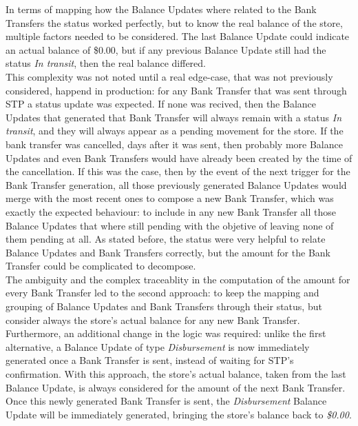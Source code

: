 In terms of mapping how the Balance Updates where related to the Bank Transfers the status worked perfectly, but to know the real balance of the store, multiple factors needed to be considered. The last Balance Update could indicate an actual balance of \$0.00, but if any previous Balance Update still had the status \textit{In transit}, then the real balance differed.\\ 

This complexity was not noted until a real edge-case, that was not previously considered, happend in production: for any Bank Transfer that was sent through STP a status update was expected. If none was recived, then the Balance Updates that generated that Bank Transfer will always remain with a status \textit{In transit}, and they will always appear as a pending movement for the store. If the bank transfer was cancelled, days after it was sent, then probably more Balance Updates and even Bank Transfers would have already been created by the time of the cancellation. If this was the case, then by the event of the next trigger for the Bank Transfer generation, all those previously generated Balance Updates would merge with the most recent ones to compose a new Bank Transfer, which was exactly the expected behaviour: to include in any new Bank Transfer all those Balance Updates that where still pending with the objetive of leaving none of them pending at all. As stated before, the status were very helpful to relate Balance Updates and Bank Transfers correctly, but the amount for the Bank Transfer could be complicated to decompose.\\

The ambiguity and the complex traceablity in the computation of the amount for every Bank Transfer led to the second approach: to keep the mapping and grouping of Balance Updates and Bank Transfers through their status, but consider always the store's actual balance for any new Bank Transfer. Furthermore, an additional change in the logic was required: unlike the first alternative, a Balance Update of type \textit{Disbursement} is now immediately generated once a Bank Transfer is sent, instead of waiting for STP's confirmation. With this approach, the store's actual balance, taken from the last Balance Update, is always considered for the amount of the next Bank Transfer. Once this newly generated Bank Transfer is sent, the \textit{Disbursement} Balance Update will be immediately generated, bringing the store's balance back to \textit{\$0.00}.\\ 

